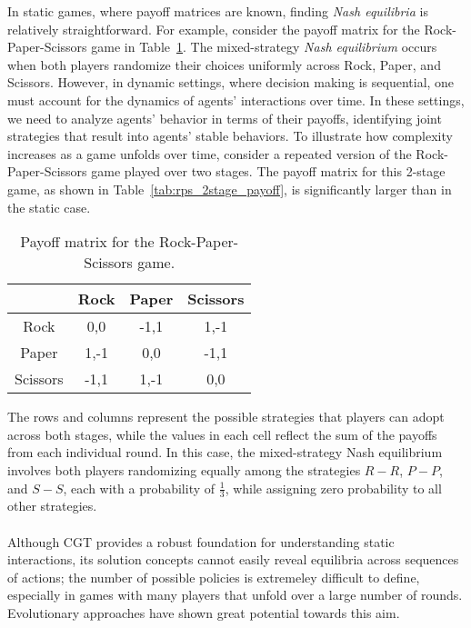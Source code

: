 \begin{flushleft}
    In static games, where payoff matrices are known, finding \emph{Nash equilibria} is relatively straightforward. For example, consider the payoff matrix for the Rock-Paper-Scissors game in Table~\ref{tab:rps_payoff}. The mixed-strategy \emph{Nash equilibrium} occurs when both players randomize their choices uniformly across Rock, Paper, and Scissors. However, in dynamic settings, where decision making is sequential, one must account for the dynamics of agents' interactions over time. In these settings, we need to analyze agents' behavior in terms of their payoffs, identifying joint strategies that result into agents' stable behaviors. To illustrate how complexity increases as a game unfolds over time, consider a repeated version of the Rock-Paper-Scissors game played over two stages. The payoff matrix for this 2-stage game, as shown in Table~\ref{tab:rps_2stage_payoff}, is significantly larger than in the static case. 
    
    \begin{table}[t]
        \centering
        \caption{Payoff matrix for the Rock-Paper-Scissors game.}
        \vspace{0.6em}
        \label{tab:rps_payoff}
        \begin{tabular}{c|c c c}
            & Rock & Paper & Scissors \\ \hline
            Rock     & 0,0    & -1,1   & 1,-1 \\
            Paper    & 1,-1   & 0,0    & -1,1 \\
            Scissors & -1,1   & 1,-1   & 0,0 \\
        \end{tabular}
    \end{table}
    
    The rows and columns represent the possible strategies that players can adopt across both stages, while the values in each cell reflect the sum of the payoffs from each individual round. In this case, the mixed-strategy Nash equilibrium involves both players randomizing equally among the strategies 
    \(R{-}R\), \(P{-}P\), and \(S{-}S\), each with a probability of \(\frac{1}{3}\), while assigning zero probability to all other strategies.\\~\\

    Although CGT provides a robust foundation for understanding static interactions, its solution concepts cannot easily reveal equilibria across sequences of actions; the number of possible policies is extremeley difficult to define, especially in games with many players that unfold over a large number of rounds. Evolutionary approaches have shown great potential towards this aim.\\~\\


\end{flushleft}
